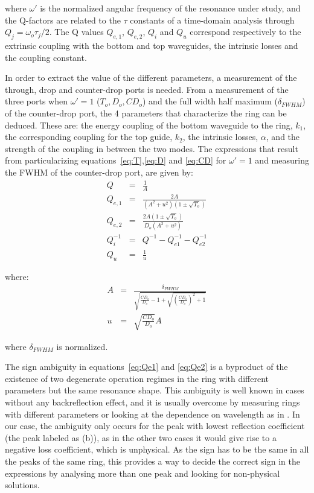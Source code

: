 \documentclass[conference,letterpaper,final]{IEEEtran}
\begin{document}
where $\omega'$ is the normalized angular frequency of the resonance under study, and the Q-factors are related to the $\tau$ constants of a time-domain analysis through $Q_j=\omega_o \tau_j/2$. The Q values $Q_{e,1}$, $Q_{e,2}$, $Q_{i}$ and $Q_{u}$ correspond respectively to the extrinsic coupling with the bottom and top waveguides, the intrinsic losses and the coupling constant. 

In order to extract the value of the different parameters, a measurement of the through, drop and counter-drop ports is needed. From a measurement of the three ports when $\omega'=1$ ($T_o,D_o,CD_o$) and the full width half maximum ($\delta_{FWHM}$) of the counter-drop port, the 4 parameters that characterize the ring can be deduced. These are: the energy coupling of the bottom waveguide to the ring, $k_1$, the corresponding coupling for the top guide, $k_2$, the intrinsic losses, $\alpha$, and the strength of the coupling in between the two modes. The expressions that result from particularizing equations~\ref{eq:T},\ref{eq:D} and \ref{eq:CD} for $\omega'=1$ and measuring the FWHM of the counter-drop port, are given by:
\begin{eqnarray}
    Q&=&\frac{1}{A} \label{eq:Q} \\
    Q_{e,1}&=&\frac{2A}{(A^2+u^2)(1\pm\sqrt{T_o})}  \label{eq:Qe1}\\
    Q_{e,2}&=&\frac{2A(1\pm\sqrt{T_o})}{D_o(A^2+u^2)}  \label{eq:Qe2}\\
    Q_i^{-1}&=&Q^{-1}-Q_{e1}^{-1}-Q_{e2}^{-1} \label{eq:Qi} \\
    Q_u&=&\frac{1}{u} \label{eq:Qu}
\end{eqnarray}

where:
\begin{eqnarray}
    A&=&\frac{\delta_{FWHM}}{\sqrt{\frac{CD_o}{D_o}-1 + \sqrt{\left(\frac{CD_o}{D_o}\right)^2+1}}}\\
    u&=&\sqrt{\frac{CD_o}{D_o}}A
\end{eqnarray}

where $\delta_{FWHM}$ is normalized.

The sign ambiguity in equations~\ref{eq:Qe1} and \ref{eq:Qe2} is a byproduct of the existence of two degenerate operation regimes in the ring with different parameters but the same resonance shape. This ambiguity is well known in cases without any backreflection effect, and it is usually  overcome by measuring rings with different parameters or looking at the dependence on wavelength as in \cite{McKinnon09}. In our case, the ambiguity only occurs for the peak with lowest reflection coefficient (the peak labeled as (b)), as in the other two cases it would give rise to a negative loss coefficient, which is unphysical. As the sign has to be the same in all the peaks of the same ring, this provides a way to decide the correct sign in the expressions by analysing more than one peak and looking for non-physical solutions.
\end{document}
